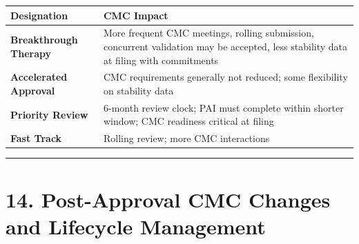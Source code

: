 \documentclass[
  11pt,
  a4paper,
]{report}
\begin{document}
\begin{longtable}[]{@{}ll@{}}
\toprule
\begin{minipage}[b]{0.51\columnwidth}\raggedright
Designation\strut
\end{minipage} & \begin{minipage}[b]{0.43\columnwidth}\raggedright
CMC Impact\strut
\end{minipage}\tabularnewline
\midrule
\endhead
\begin{minipage}[t]{0.51\columnwidth}\raggedright
\textbf{Breakthrough Therapy}\strut
\end{minipage} & \begin{minipage}[t]{0.43\columnwidth}\raggedright
More frequent CMC meetings, rolling submission, concurrent validation
may be accepted, less stability data at filing with commitments\strut
\end{minipage}\tabularnewline
\begin{minipage}[t]{0.51\columnwidth}\raggedright
\textbf{Accelerated Approval}\strut
\end{minipage} & \begin{minipage}[t]{0.43\columnwidth}\raggedright
CMC requirements generally not reduced; some flexibility on stability
data\strut
\end{minipage}\tabularnewline
\begin{minipage}[t]{0.51\columnwidth}\raggedright
\textbf{Priority Review}\strut
\end{minipage} & \begin{minipage}[t]{0.43\columnwidth}\raggedright
6-month review clock; PAI must complete within shorter window; CMC
readiness critical at filing\strut
\end{minipage}\tabularnewline
\begin{minipage}[t]{0.51\columnwidth}\raggedright
\textbf{Fast Track}\strut
\end{minipage} & \begin{minipage}[t]{0.43\columnwidth}\raggedright
Rolling review; more CMC interactions\strut
\end{minipage}\tabularnewline
\bottomrule
\end{longtable}

\begin{center}\rule{0.5\linewidth}{0.5pt}\end{center}

\hypertarget{post-approval-cmc-changes-and-lifecycle-management}{%
\section{14. Post-Approval CMC Changes and Lifecycle
Management}\label{post-approval-cmc-changes-and-lifecycle-management}}
\end{document}
